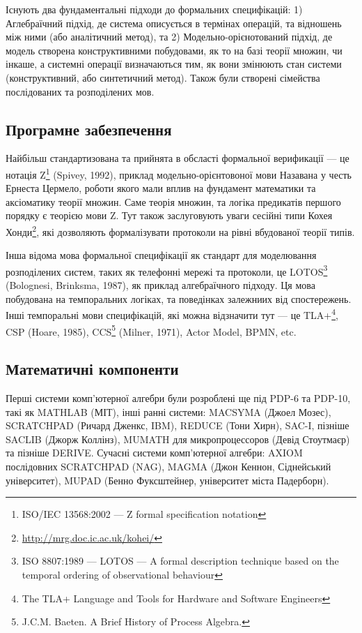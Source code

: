 Існують два фундаментальні підходи до формальних специфікацій: 1) Аглебраїчний підхід, де
система описується в термінах операцій, та відношень між ними (або аналітичний метод), та
2) Модельно-орієнотований підхід, де модель створена конструктивними побудовами,
як то на базі теорії множин, чи інкаше, а системні операції визначаються тим,
як вони змінюють стан системи (конструктивний, або синтетичний метод).
Також були створені сімейства послідованих та розподілених мов.

\subsection{Програмне забезпечення}
Найбільш стандартизована та прийнята в обсласті формальної верификації --- це нотація
Z\footnote{ISO/IEC 13568:2002 --- Z formal specification notation} (Spivey, 1992), приклад
модельно-орієнтовоної мови
Назавана у честь Ернеста Цермело, роботи якого мали вплив на фундамент математики та аксіоматику
теорії множин. Саме теорія множин, та логіка предикатів першого порядку є теорією мови Z.
Тут також заслуговують уваги сесійні типи Кохея Хонди\footnote{\url{ http://mrg.doc.ic.ac.uk/kohei/}},
які дозволяють формалізувати протоколи на рівні вбудованої теорії типів.

Інша відома мова формальної специфікації як стандарт
для моделювання розподілених систем, таких як телефонні мережі та протоколи, це
LOTOS\footnote{ISO 8807:1989 --- LOTOS --- A formal description technique based
on the temporal ordering of observational behaviour} (Bolognesi, Brinksma, 1987),
як приклад алгебраїчного підходу.
Ця мова побудована на темпоральних логіках, та поведінках залежниих від спостережень.
Інші темпоральні мови специфікацій, які можна відзначити тут --- це TLA+\footnote{The
TLA+ Language and Tools for Hardware and Software Engineers}, CSP (Hoare, 1985),
CCS\footnote{J.C.M. Baeten. A Brief History of Process Algebra.} (Milner, 1971), Actor Model, BPMN, etc.

\newpage
\subsection{Математичні компоненти}
Перші системи комп'ютерної алгебри були розроблені ще під PDP-6 та PDP-10,
такі як MATHLAB (МІТ), інші ранні системи:
MACSYMA (Джоел Мозес),
SCRATCHPAD (Ричард Дженкс, IBM),
REDUCE (Тони Хирн),
SAC-I, пізніше SACLIB (Джорж Коллінз),
MUMATH для микропроцессоров (Девід Стоутмаєр) та пізніше DERIVE.
Сучасні системи комп'ютерної алгебри:
AXIOM послідовних SCRATCHPAD (NAG),
MAGMA (Джон Кеннон, Сіднейський університет),
MUPAD (Бенно Фуксштейнер, університет міста Падерборн).

